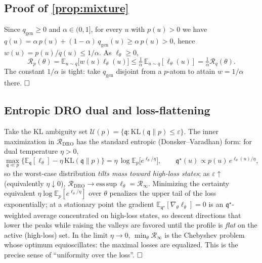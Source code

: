\documentclass{article}
\theoremstyle{plain}
\theoremstyle{definition}
\theoremstyle{remark}
\newcommand{\E}{\mathbb{E}}
\newcommand{\state}{u}
\newcommand{\lossf}{\ell_\theta}
\newcommand{\pnat}{p}
\newcommand{\qtr}{q}
\newcommand{\qgen}{q_{\mathrm{gen}}}
\newcommand{\Rp}{\mathcal{R}_{\pnat}}
\newcommand{\Rq}{\mathcal{R}_{\qtr}}
\newcommand{\Rinf}{\mathcal{R}_{\infty}}
\newcommand{\Rdro}{\mathcal{R}_{\mathrm{DRO}}}
\newcommand{\unif}{\alpha}
\begin{document}
\subsection{Proof of \cref{prop:mixture}}\label{app:mixture}
Since $\qgen\ge0$ and $\unif\in(0,1]$, for every $\state$ with $\pnat(\state)>0$ we have
$\qtr(\state)=\unif\,\pnat(\state)+(1-\unif)\,\qgen(\state)\ge \unif\,\pnat(\state)>0$, hence
$w(\state)=\pnat(\state)/\qtr(\state)\le 1/\unif$. As $\lossf\ge0$,
\[
  \Rp(\theta)=\E_{\state\sim\qtr}\!\big[w(\state)\lossf(\state)\big]
  \le \tfrac1\unif\,\E_{\state\sim\qtr}[\lossf(\state)]=\tfrac1\unif\Rq(\theta).
\]
The constant $1/\unif$ is tight: take $\qgen$ disjoint from a $\pnat$-atom to attain $w=1/\unif$ there.
$\hfill\square$

\subsection{Entropic DRO dual and loss-flattening}\label{app:waterfilling}
Take the KL ambiguity set $\mathcal{U}(\pnat)=\{\mathfrak q:\mathrm{KL}(\mathfrak q\|\pnat)\le\varepsilon\}$.
The inner maximization in $\Rdro$ has the standard entropic (Donsker--Varadhan) form: for dual
temperature $\eta>0$,
\[
  \max_{\mathfrak q\ll\pnat}\Big\{\E_{\mathfrak q}[\lossf]-\eta\,\mathrm{KL}(\mathfrak q\|\pnat)\Big\}
  =\eta\,\log\E_{\pnat}\!\big[e^{\lossf/\eta}\big],
  \qquad
  \mathfrak q^\star(\state)\propto \pnat(\state)\,e^{\lossf(\state)/\eta},
\]
so the worst-case distribution \emph{tilts mass toward high-loss states}; as $\varepsilon\!\uparrow$
(equivalently $\eta\!\downarrow0$), $\Rdro\to\mathrm{ess\,sup}\,\lossf=\Rinf$. Minimizing the certainty
equivalent $\eta\log\E_{\pnat}[e^{\lossf/\eta}]$ over $\theta$ penalizes the upper tail of the loss
exponentially; at a stationary point the gradient $\E_{\mathfrak q^\star}[\nabla_\theta\lossf]=0$ is an
$\mathfrak q^\star$-weighted average concentrated on high-loss states, so descent directions that lower
the peaks while raising the valleys are favored until the profile is \emph{flat} on the active (high-loss)
set. In the limit $\eta\to0$, $\min_\theta\Rinf$ is the Chebyshev problem whose optimum equioscillates:
the maximal losses are equalized. This is the precise sense of ``uniformity over the loss''. $\hfill\square$
\end{document}
